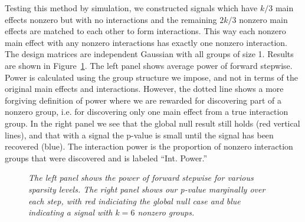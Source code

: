 \documentclass{imsart}
\begin{document}
Testing this method by simulation, we constructed signals which have
$k/3$ main effects nonzero but with no interactions and the remaining
$2k/3$ nonzero main effects are matched to each other to form interactions.
This way each nonzero main effect with any nonzero interactions has
exactly one nonzero interaction.
The design matrices are independent Gaussian with all groups of size 1.
Results are shown in Figure~\ref{fig:glint}. The left
panel shows average power of forward stepwise. Power is calculated
using the group structure we impose, and not in terms of the original
main effects and interactions. However, the dotted line shows a more
forgiving definition of power where we are rewarded for discovering part
of a nonzero group, i.e. for discovering only one main effect from a
true interaction group. In the right panel we see that the global null
result still holds (red vertical lines), and that with a signal the
p-value is small until the signal has been recovered (blue). The
interaction power is the proportion of nonzero interaction groups
that were discovered and is labeled ``Int. Power.''

\begin{figure}
\begin{center}
\hspace{-15pt}
\caption{\small \it The left panel shows the power of forward stepwise
for various sparsity levels. The right panel shows our p-value marginally
over each step, with red indiciating the global null case and blue
indicating a signal with $k=6$ nonzero groups.}
\label{fig:glint}
\end{center}
\end{figure}
\end{document}

